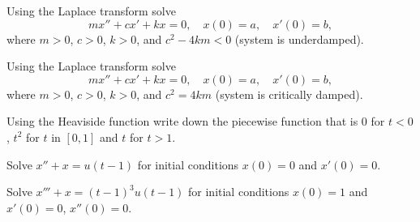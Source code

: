 \begin{exercise}
Using the Laplace transform solve
\begin{equation*}
m x'' + c x' + k x = 0 , \quad x(0) = a, \quad x'(0) = b ,
\end{equation*}
where $m > 0$, $c > 0$, $k > 0$, and
$c^2 - 4km < 0$ (system is underdamped).
\end{exercise}

\begin{exercise}
Using the Laplace transform solve
\begin{equation*}
m x'' + c x' + k x = 0 , \quad x(0) = a, \quad x'(0) = b ,
\end{equation*}
where $m > 0$, $c > 0$, $k > 0$, and
$c^2 = 4km$ (system is critically damped).
\end{exercise}

\begin{exercise}
	Using the Heaviside function write down the piecewise function
	that is 0 for $t < 0$, $t^2$ for $t$ in $[0,1]$ and $t$ for $t > 1$.
\end{exercise}

\begin{exercise}
Solve $x'' + x = u(t-1)$ for initial conditions $x(0) = 0$ and $x'(0) = 0$.
\end{exercise}

\begin{exercise}
Solve $x''' + x = (t-1)^3 u(t-1)$ for initial conditions $x(0) = 1$ and $x'(0) =
0$, $x''(0) = 0$.
\end{exercise}

